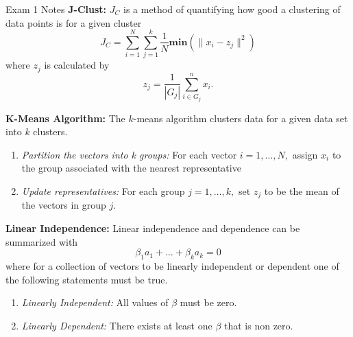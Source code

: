 \begin{examnotes}{Exam 1 Notes}
    \textbf{J-Clust:} $J_{C}$ is a method of quantifying how good a clustering of data points is for a given cluster
    \begin{equation*}
        J_{C} = \sum_{i = 1}^{N}\sum_{j = 1}^{k} \frac{1}{N} \mathbf{min}(\|x_{i} - z_{j}\|^{2})
    \end{equation*}
    where $z_{j}$ is calculated by 
    \begin{equation*}
        z_{j} = \frac{1}{|G_{j}|} \sum_{i \in G_{j}}^{n} x_{i}.
    \end{equation*}

    \textbf{K-Means Algorithm:} The $k$-means algorithm clusters data for a given data set into $k$ clusters.
    \begin{enumerate}
        \item \textit{Partition the vectors into k groups:} For each vector $i = 1, \dots, N,$ assign $x_{i}$ to the group associated with the nearest representative
        \item \textit{Update representatives:} For each group $j = 1, \dots, k,$ set $z_{j}$ to be the mean of the vectors in group $j$.
    \end{enumerate}

    \textbf{Linear Independence:} Linear independence and dependence can be summarized with
    \begin{equation*}
        \beta_{1}a_{1} + \dots + \beta_{k}a_{k} = 0
    \end{equation*}
    where for a collection of vectors to be linearly independent or dependent one of the following statements must be true.
    \begin{enumerate}
        \item \textit{Linearly Independent:} All values of $\beta$ must be zero.
        \item \textit{Linearly Dependent:} There exists at least one $\beta$ that is non zero.
    \end{enumerate}
\end{examnotes}

